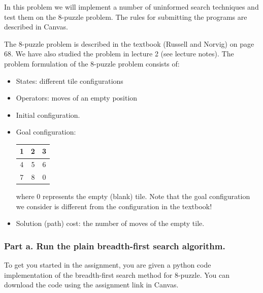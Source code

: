 \documentclass[11pt]{article}
\begin{document}
In this problem we will implement a number of uninformed search techniques and test them on the 8-puzzle problem. The rules for submitting the programs are described in Canvas. 

The 8-puzzle problem is described in the textbook (Russell and Norvig) on page 68. We have also studied the problem in lecture 2 (see lecture notes). The problem formulation of the 8-puzzle problem consists of: 
\begin{itemize}
\item States: different tile configurations
\item Operators: moves of an empty position
\item Initial configuration.
\item Goal configuration:\\
\begin{tabular}{|c|c|c|}
	\hline
      1 & 2 & 3\\
	\hline
      4 & 5 & 6\\
	\hline
      7 & 8 & 0\\
	\hline
\end{tabular}

where $0$ represents the empty (blank) tile. Note that the goal
configuration we consider is different from the configuration in
the textbook!
\item Solution (path) cost: the number of moves of the empty tile.
\end {itemize}

\subsubsection*{Part a. Run the plain breadth-first search algorithm.} 

To get you started in the assignment, you are given a python code implementation of the breadth-first search method for 8-puzzle. You can download the code using the assignment link in Canvas. 
\end{document}
